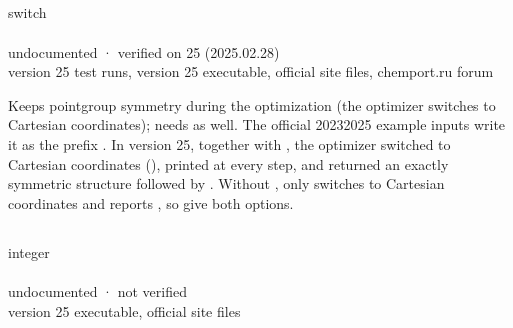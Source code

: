\documentclass[letterpaper,10pt,english,openany,oneside]{sphinxmanual}
\begin{document}
\subsection{}
\label{\detokenize{reference/optimize:symmetry}}\label{\detokenize{reference/optimize:optimize-symmetry}}
\ignorespaces 
\sphinxAtStartPar
{} switch\\
 \\
 undocumented · verified on 25 (2025.02.28)\\
 version 25 test runs, version 25 executable, official site files, chemport.ru forum

\sphinxAtStartPar
Keeps point\sphinxhyphen{}group symmetry during the optimization (the optimizer switches to Cartesian coordinates); needs
 as well. The official 2023\textendash{}2025 example inputs write it as the prefix . In version 25,
together with , the optimizer switched to Cartesian coordinates (), printed  at
every step, and returned an exactly symmetric structure followed by . Without
,  only switches to Cartesian coordinates and reports ,
so give both options.

\sphinxAtStartPar
{} {\hyperref[\detokenize{reference/molecule:molecule-sym}]{}}


\subsection{}
\label{\detokenize{reference/optimize:model}}\label{\detokenize{reference/optimize:optimize-model}}
\ignorespaces 
\sphinxAtStartPar
{} integer\\
 \\
 undocumented · not verified\\
 version 25 executable, official site files
\end{document}
